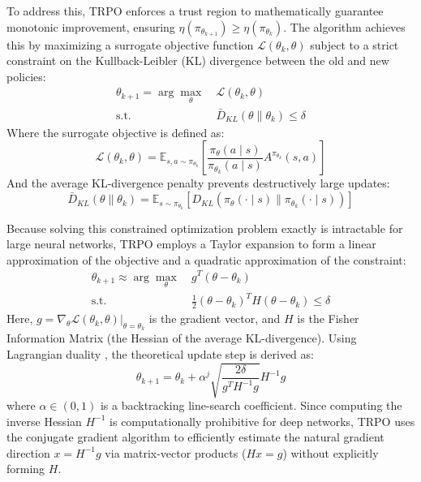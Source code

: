 \documentclass[a4paper]{scrartcl}
\begin{document}
To address this, TRPO enforces a trust region to mathematically guarantee monotonic improvement, ensuring $\eta(\pi_{\theta_{k+1}}) \geq \eta(\pi_{\theta_k})$. The algorithm achieves this by maximizing a surrogate objective function $\mathcal{L}(\theta_k, \theta)$ subject to a strict constraint on the Kullback-Leibler (KL) divergence between the old and new policies:
\begin{equation}
\begin{aligned}
    \theta_{k+1} = \arg \max_{\theta} \ & \mathcal{L}(\theta_k, \theta) \\
    \text{s.t. } & \bar{D}_{KL}(\theta \parallel \theta_k) \leq \delta
\end{aligned}
\end{equation}
Where the surrogate objective is defined as:
\begin{equation}
    \mathcal{L}(\theta_k, \theta) = \mathbb{E}_{s, a \sim \pi_{\theta_k}} \left[ \frac{\pi_\theta(a \mid s)}{\pi_{\theta_k}(a \mid s)} A^{\pi_{\theta_k}}(s, a) \right]
\end{equation}
And the average KL-divergence penalty prevents destructively large updates:
\begin{equation}
    \bar{D}_{KL}(\theta \parallel \theta_k) = \mathbb{E}_{s \sim \pi_{\theta_k}} \left[ D_{KL} \left( \pi_\theta(\cdot \mid s) \parallel \pi_{\theta_k}(\cdot \mid s) \right) \right]
\end{equation}

Because solving this constrained optimization problem exactly is intractable for large neural networks, TRPO employs a Taylor expansion to form a linear approximation of the objective and a quadratic approximation of the constraint:
\begin{equation}
\begin{aligned}
    \theta_{k+1} \approx \arg \max_{\theta} \ & g^T (\theta - \theta_k) \\
    \text{s.t. } & \frac{1}{2} (\theta - \theta_k)^T H (\theta - \theta_k) \leq \delta
\end{aligned}
\end{equation}
Here, $g = \nabla_\theta \mathcal{L}(\theta_k,\theta)|_{\theta=\theta_k}$ is the gradient vector, and $H$ is the Fisher Information Matrix (the Hessian of the average KL-divergence). Using Lagrangian duality \cite[Ch. 2]{BoydVandenberghe2004}, the theoretical update step is derived as:
\begin{equation}
    \theta_{k+1} = \theta_k + \alpha^j \sqrt{\frac{2\delta}{g^T H^{-1} g}} H^{-1} g
\end{equation}
where $\alpha \in (0,1)$ is a backtracking line-search coefficient. Since computing the inverse Hessian $H^{-1}$ is computationally prohibitive for deep networks, TRPO uses the conjugate gradient algorithm \cite{Shewchuk1994} to efficiently estimate the natural gradient direction $x = H^{-1}g$ via matrix-vector products ($Hx = g$) without explicitly forming $H$.
\end{document}
